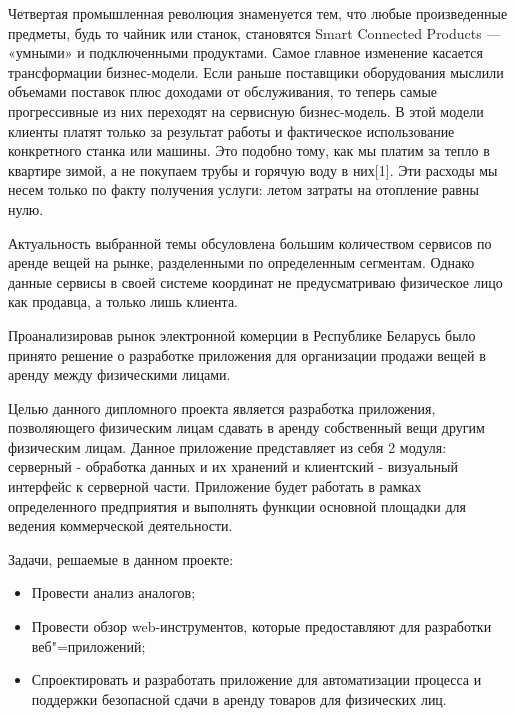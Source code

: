 \label{sec:intro}

Четвертая промышленная революция знаменуется тем, что любые произведенные предметы, будь то чайник или станок, становятся Smart Connected Products — «умными» и подключенными продуктами.
Самое главное изменение касается трансформации бизнес-модели. Если раньше поставщики оборудования мыслили объемами поставок плюс доходами от обслуживания, то теперь самые прогрессивные из них переходят на сервисную бизнес-модель.
В этой модели клиенты платят только за результат работы и фактическое использование конкретного станка или машины.
Это подобно тому, как мы платим за тепло в квартире зимой, а не покупаем трубы и горячую воду в них[1].
Эти расходы мы несем только по факту получения услуги: летом затраты на отопление равны нулю.

Актуальность выбранной темы обсуловлена большим количеством сервисов по аренде вещей на рынке, разделенными по определенным сегментам.
Однако данные сервисы в своей системе координат не предусматриваю физическое лицо как продавца, а только лишь клиента.

Проанализировав рынок электронной комерции в Республике Беларусь было принято решение о разработке приложения для организации продажи вещей в аренду между физическими лицами.

Целью данного дипломного проекта является разработка приложения, позволяющего физическим лицам сдавать в аренду собственный вещи другим физическим лицам.
Данное приложение представляет из себя 2 модуля: серверный - обработка данных и их хранений и клиентский - визуальный интерфейс к серверной части.
Приложение будет работать в рамках определенного предприятия и выполнять функции основной площадки для ведения коммерческой деятельности.

Задачи, решаемые в данном проекте:
\begin{itemize}
    \item Провести анализ аналогов;
    \item Провести обзор web-инструментов, которые предоставляют для разработки веб"=приложений;
    \item Спроектировать и разработать приложение для автоматизации процесса и поддержки безопасной сдачи в аренду товаров для физических лиц.
\end{itemize}
